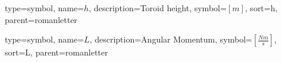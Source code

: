 {
	type=symbol, %
	name={\ensuremath{h}}, %
	description={Toroid height}, %
	symbol={$\left[m\right]$}, %
	sort=h, %
	parent=romanletter %
}

{
	type=symbol, %
	name={\ensuremath{L}}, %
	description={Angular Momentum}, %
	symbol={$\left[\frac{Nm}{s}\right]$}, %
	sort=L, %
	parent=romanletter %
}
